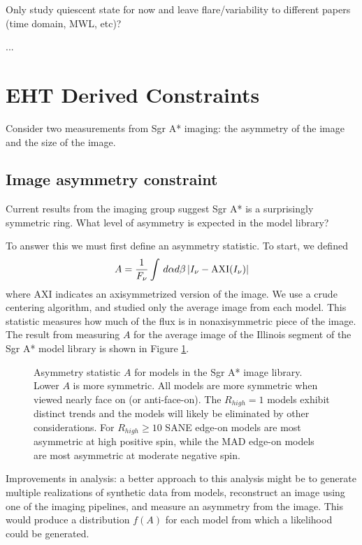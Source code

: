 \documentclass[twocolumn,tighten]{aastex63}
\newcommand\<{{\langle}}
\renewcommand\>{{\rangle}} %
\begin{document}
Only study quiescent state for now and leave flare/variability to different papers (time domain, MWL, etc)?

...

\section{EHT Derived Constraints}

Consider two measurements from Sgr A* imaging: the asymmetry of the image and the size of the image.

\subsection{Image asymmetry constraint}

Current results from the imaging group suggest Sgr A* is a surprisingly symmetric ring.   What level of asymmetry is expected in the model library?

To answer this we must first define an asymmetry statistic.  To start, we defined
\begin{equation}
    A = \frac{1}{F_\nu} \int \, d\alpha d\beta \, | I_\nu - {\rm AXI}(I_\nu) |
\end{equation}
where AXI indicates an axisymmetrized version of the image.  We use a crude centering algorithm, and studied only the average image from each model.  This statistic measures how much of the flux is in nonaxisymmetric piece of the image.   The result from measuring $A$ for the average image of the Illinois segment of the Sgr A* model library is shown in Figure \ref{fig:asymm}.

\begin{figure}\label{fig:asymm}
    \caption{Asymmetry statistic $A$ for models in the Sgr A* image library.  Lower $A$ is more symmetric.  All models are more symmetric when viewed nearly face on (or anti-face-on).  The $R_{high} = 1$ models exhibit distinct trends and the models will likely be eliminated by other considerations.  For $R_{high} \ge 10$ SANE edge-on models are most asymmetric at high positive spin, while the MAD edge-on models are most asymmetric at moderate negative spin.}
\end{figure}

Improvements in analysis: a better approach to this analysis might be to generate multiple realizations of synthetic data from models, reconstruct an image using one of the imaging pipelines, and measure an asymmetry from the image.  This would produce a distribution $f(A)$ for each model from which a likelihood could be generated.
\end{document}

